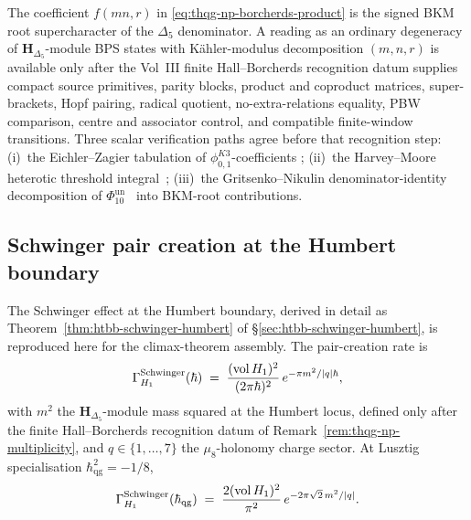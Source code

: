 \begin{remark}
\label{rem:thqg-np-multiplicity}
The coefficient $f(mn,r)$ in \eqref{eq:thqg-np-borcherds-product} is
the signed BKM root supercharacter of the $\Delta_5$ denominator.  A
reading as an ordinary degeneracy of
$\mathbf{H}_{\Delta_5}$-module BPS states with K\"ahler-modulus
decomposition $(m,n,r)$ is available only after the Vol~III finite
Hall--Borcherds recognition datum supplies compact source primitives,
parity blocks, product and coproduct matrices, super-brackets, Hopf
pairing, radical quotient, no-extra-relations equality, PBW comparison,
centre and associator control, and compatible finite-window transitions.
Three scalar verification paths agree before that recognition step:
(i)~the Eichler--Zagier tabulation of $\phi_{0,1}^{K3}$-coefficients
\cite[\S 9]{EichlerZagier1985}; (ii)~the Harvey--Moore heterotic threshold
integral~\cite[\S 4]{HarveyMoore1996}; (iii)~the
Gritsenko--Nikulin denominator-identity decomposition of
$\Phi_{10}^{\mathrm{un}}$~\cite[Thm.~2.1]{GritsenkoNikulin1998} into BKM-root
contributions.
\end{remark}

\subsection{Schwinger pair creation at the Humbert boundary}
\label{subsec:thqg-np-schwinger-boundary}

The Schwinger effect at the Humbert boundary, derived in detail as
Theorem~\ref{thm:htbb-schwinger-humbert} of
\S\ref{sec:htbb-schwinger-humbert}, is reproduced here for the
climax-theorem assembly. The pair-creation rate is
\begin{equation}\label{eq:thqg-np-schwinger-rate}
 \Gamma^{\mathrm{Schwinger}}_{H_1}(\hbar)
 \;=\; \frac{(\operatorname{vol} H_1)^2}{(2\pi\hbar)^2}\,e^{-\pi m^2/|q|\hbar},
\end{equation}
with $m^2$ the $\mathbf{H}_{\Delta_5}$-module mass squared at the
Humbert locus, defined only after the finite Hall--Borcherds
recognition datum of Remark~\ref{rem:thqg-np-multiplicity}, and
$q\in\{1, \ldots, 7\}$ the $\mu_8$-holonomy charge sector. At Lusztig
specialisation $\hbar_{\mathrm{qg}}^2 = -1/8$,
\[
 \Gamma^{\mathrm{Schwinger}}_{H_1}(\hbar_{\mathrm{qg}})
 \;=\; \frac{2(\operatorname{vol} H_1)^2}{\pi^2}\,e^{-2\pi\sqrt 2\,m^2/|q|}.
\]

